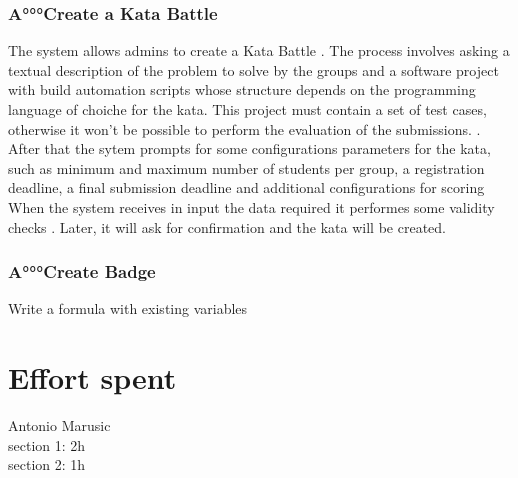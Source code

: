 \documentclass{article}
\newcommand{\admins}{admins }
\newcommand{\groups}{groups }
\begin{document}
            \subsubsection{A°°°Create a Kata Battle}
                The system allows \admins to create a Kata Battle
                . The process involves asking a
                textual description of the problem to solve by the \groups and a software project with build automation scripts whose structure depends on the programming language of choiche for the kata. This project must contain a set of test cases, otherwise it won't be possible to perform the evaluation of the submissions. 
                .
                After that the sytem prompts for some configurations parameters for the kata, such as minimum and maximum number of students per group, a registration deadline, a final submission deadline
                and additional configurations for scoring
                \\

                When the system receives in input the data required it performes some validity checks
                .
                 Later, it will ask for confirmation and the kata will be created.
                
            \subsubsection{A°°°Create Badge}
                Write a formula with existing variables



\section{Effort spent}
    Antonio Marusic\\
    section 1: 2h\\
    section 2: 1h\\
    
\end{document}
